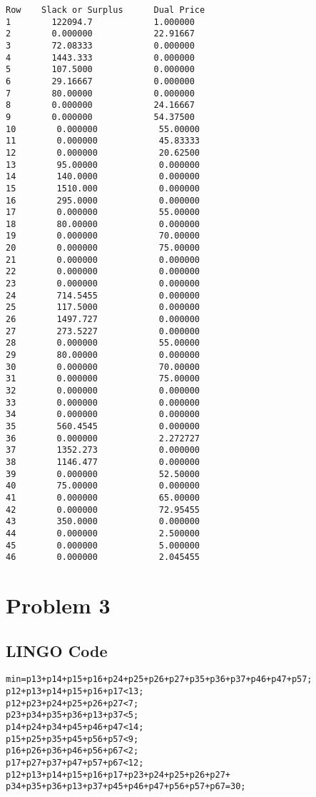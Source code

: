 \documentclass[12pt]{article}
\begin{document}
\begin{appendices}
\begin{lstlisting}
Row    Slack or Surplus      Dual Price
1        122094.7            1.000000
2        0.000000            22.91667
3        72.08333            0.000000
4        1443.333            0.000000
5        107.5000            0.000000
6        29.16667            0.000000
7        80.00000            0.000000
8        0.000000            24.16667
9        0.000000            54.37500
10        0.000000            55.00000
11        0.000000            45.83333
12        0.000000            20.62500
13        95.00000            0.000000
14        140.0000            0.000000
15        1510.000            0.000000
16        295.0000            0.000000
17        0.000000            55.00000
18        80.00000            0.000000
19        0.000000            70.00000
20        0.000000            75.00000
21        0.000000            0.000000
22        0.000000            0.000000
23        0.000000            0.000000
24        714.5455            0.000000
25        117.5000            0.000000
26        1497.727            0.000000
27        273.5227            0.000000
28        0.000000            55.00000
29        80.00000            0.000000
30        0.000000            70.00000
31        0.000000            75.00000
32        0.000000            0.000000
33        0.000000            0.000000
34        0.000000            0.000000
35        560.4545            0.000000
36        0.000000            2.272727
37        1352.273            0.000000
38        1146.477            0.000000
39        0.000000            52.50000
40        75.00000            0.000000
41        0.000000            65.00000
42        0.000000            72.95455
43        350.0000            0.000000
44        0.000000            2.500000
45        0.000000            5.000000
46        0.000000            2.045455
\end{lstlisting}
\section{Problem 3}
\subsection{LINGO Code}
\begin{lstlisting}
min=p13+p14+p15+p16+p24+p25+p26+p27+p35+p36+p37+p46+p47+p57;
p12+p13+p14+p15+p16+p17<13;
p12+p23+p24+p25+p26+p27<7;
p23+p34+p35+p36+p13+p37<5;
p14+p24+p34+p45+p46+p47<14;
p15+p25+p35+p45+p56+p57<9;
p16+p26+p36+p46+p56+p67<2;
p17+p27+p37+p47+p57+p67<12;
p12+p13+p14+p15+p16+p17+p23+p24+p25+p26+p27+
p34+p35+p36+p13+p37+p45+p46+p47+p56+p57+p67=30;
\end{lstlisting}

\end{appendices}
\end{document}
